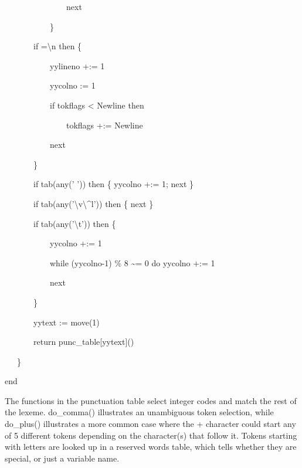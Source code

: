 {\ttfamily\mdseries
\ \ \ \ \ \ \ \ \ \ \ \ \ \ \ next}

{\ttfamily\mdseries
\ \ \ \ \ \ \ \ \ \ \ \}}

{\ttfamily\mdseries
\ \ \ \ \ \ \ if ={\textquotedbl}{\textbackslash}n{\textquotedbl} then \{}

{\ttfamily\mdseries
\ \ \ \ \ \ \ \ \ \ \ yylineno +:= 1}

{\ttfamily\mdseries
\ \ \ \ \ \ \ \ \ \ \ yycolno := 1}

{\ttfamily\mdseries
\ \ \ \ \ \ \ \ \ \ \ if tokflags {\textless} Newline then}

{\ttfamily\mdseries
\ \ \ \ \ \ \ \ \ \ \ \ \ \ \ tokflags +:= Newline}

{\ttfamily\mdseries
\ \ \ \ \ \ \ \ \ \ \ next}

{\ttfamily\mdseries
\ \ \ \ \ \ \ \}}

{\ttfamily\mdseries
\ \ \ \ \ \ \ if tab(any(' ')) then \{ yycolno +:= 1; next \}}

{\ttfamily\mdseries
\ \ \ \ \ \ \ if tab(any('{\textbackslash}v{\textbackslash}\^{}l')) then \{ next \}}

{\ttfamily\mdseries
\ \ \ \ \ \ \ if tab(any('{\textbackslash}t')) then \{}

{\ttfamily\mdseries
\ \ \ \ \ \ \ \ \ \ \ yycolno +:= 1}

{\ttfamily\mdseries
\ \ \ \ \ \ \ \ \ \ \ while (yycolno-1) \% 8 \~{}= 0 do yycolno +:= 1}

{\ttfamily\mdseries
\ \ \ \ \ \ \ \ \ \ \ next}

{\ttfamily\mdseries
\ \ \ \ \ \ \ \}}


\bigskip

{\ttfamily\mdseries
\ \ \ \ \ \ \ yytext := move(1)}

{\ttfamily\mdseries
\ \ \ \ \ \ \ return punc\_table[yytext]()}

{\ttfamily\mdseries
\ \ \ \}}

{\ttfamily\mdseries
end}


The functions in the punctuation table select integer codes and match
the rest of the lexeme. do\_comma() illustrates an unambiguous token
selection, while do\_plus() illustrates a more common case where the
{\textquotedbl}+{\textquotedbl} character could start any of 5
different tokens depending on the character(s) that follow it. Tokens
starting with {\textquotedbl}letters{\textquotedbl} are looked up in a
reserved words table, which tells whether they are special, or just a
variable name.

